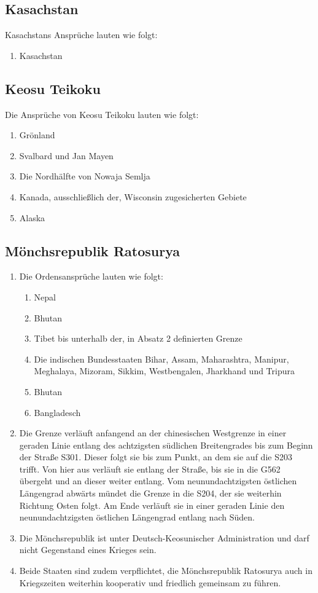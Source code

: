 \documentclass{article}
\begin{document}
\subsection{Kasachstan}
Kasachstans Ansprüche lauten wie folgt:
\begin{enumerate}
    \item Kasachstan
\end{enumerate}

\subsection{Keosu Teikoku}
Die Ansprüche von Keosu Teikoku lauten wie folgt:
\begin{enumerate}
    \item Grönland
    \item Svalbard und Jan Mayen
    \item Die Nordhälfte von Nowaja Semlja
    \item Kanada, ausschließlich der, Wisconsin zugesicherten Gebiete
    \item Alaska
\end{enumerate}

\subsection{Mönchsrepublik Ratosurya}\label{order}
\begin{enumerate}[(1)]
    \item Die Ordensansprüche lauten wie folgt:
    \begin{enumerate}[1.]
        \item Nepal
        \item Bhutan
        \item Tibet bis unterhalb der, in Absatz 2 definierten Grenze
        \item Die indischen Bundesstaaten Bihar, Assam, Maharashtra, Manipur, Meghalaya, Mizoram, Sikkim, Westbengalen, Jharkhand und Tripura
        \item Bhutan
        \item Bangladesch
    \end{enumerate}
    \item Die Grenze verläuft anfangend an der chinesischen Westgrenze in einer geraden Linie entlang des achtzigsten südlichen Breitengrades
    bis zum Beginn der Straße S301. Dieser folgt sie bis zum Punkt, an dem sie auf die S203 trifft. Von hier aus verläuft sie entlang der Straße,
    bis sie in die G562 übergeht und an dieser weiter entlang. Vom neunundachtzigsten östlichen Längengrad abwärts mündet die Grenze in die S204, der sie weiterhin Richtung Osten folgt.
    Am Ende verläuft sie in einer geraden Linie den neunundachtzigsten östlichen Längengrad entlang nach Süden. 
    \item Die Mönchsrepublik ist unter Deutsch-Keosunischer Administration und darf nicht Gegenstand eines Krieges sein.
    \item Beide Staaten sind zudem verpflichtet, die Mönchsrepublik Ratosurya auch in Kriegszeiten weiterhin kooperativ und friedlich gemeinsam zu führen.
\end{enumerate}
\end{document}
